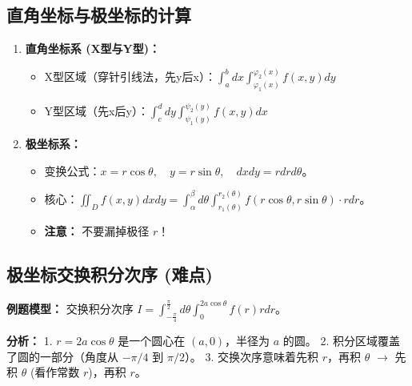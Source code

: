 \documentclass[a4paper,12pt]{ctexart}
\begin{document}
\subsection{直角坐标与极坐标的计算}
\begin{enumerate}
    \item \textbf{直角坐标系 (X型与Y型)：}
    \begin{itemize}
        \item X型区域（穿针引线法，先y后x）：$\int_a^b dx \int_{\varphi_1(x)}^{\varphi_2(x)} f(x,y) dy$
        \item Y型区域（先x后y）：$\int_c^d dy \int_{\psi_1(y)}^{\psi_2(y)} f(x,y) dx$
    \end{itemize}
    \item \textbf{极坐标系：}
    \begin{itemize}
        \item 变换公式：$x = r\cos\theta, \quad y = r\sin\theta, \quad dxdy = r dr d\theta$。
        \item 核心：$\iint_D f(x,y) dxdy = \int_\alpha^\beta d\theta \int_{r_1(\theta)}^{r_2(\theta)} f(r\cos\theta, r\sin\theta) \cdot r dr$。
        \item \textbf{注意：} 不要漏掉极径 $r$！
    \end{itemize}
\end{enumerate}

\subsection{极坐标交换积分次序 (难点)}
\textbf{例题模型：} 交换积分次序 $I = \int_{-\frac{\pi}{4}}^{\frac{\pi}{2}} d\theta \int_0^{2a\cos\theta} f(r) r dr$。

\textbf{分析：}
1. $r = 2a\cos\theta$ 是一个圆心在 $(a,0)$，半径为 $a$ 的圆。
2. 积分区域覆盖了圆的一部分（角度从 $-\pi/4$ 到 $\pi/2$）。
3. 交换次序意味着先积 $r$，再积 $\theta$ $\to$ 先积 $\theta$ (看作常数 $r$)，再积 $r$。

\begin{center}
\end{center}
\end{document}

